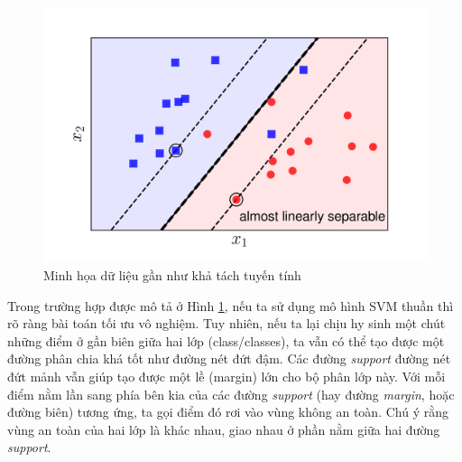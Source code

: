\documentclass[a4paper, 12pt, oneside]{report}
\begin{document}
\begin{center}
    \begin{figure}[H]
    \begin{center}
     \includegraphics[scale=0.1]{ssvm2.png}
    \end{center}
    \caption{ Minh họa dữ liệu gần như khả tách tuyến tính}
    \label{Hình 2.4}
    \end{figure}
\end{center} 
 Trong trường hợp được mô tả ở Hình \ref{Hình 2.4}, nếu ta sử dụng mô hình SVM thuần thì rõ ràng bài toán tối ưu vô nghiệm. Tuy nhiên, nếu ta lại chịu hy sinh một chút những điểm ở gần biên giữa hai lớp (class/classes), ta vẫn có thể tạo được một đường phân chia khá tốt như đường nét đứt đậm. Các đường \textit{support} đường nét đứt mảnh vẫn giúp tạo được một lề (margin) lớn cho bộ phân lớp này. Với mỗi điểm nằm lần sang phía bên kia của các đường \textit{support} (hay đường \textit{margin}, hoặc đường biên) tương ứng, ta gọi điểm đó rơi vào vùng không an toàn. Chú ý rằng vùng an toàn của hai lớp là khác nhau, giao nhau ở phần nằm giữa hai đường \textit{support}.
\end{document}
